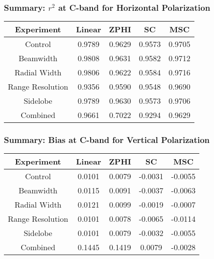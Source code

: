 \begin{frame}
    \frametitle{Summary: $r^2$ at C-band for Horizontal Polarization}
    \begin{center}
        \begin{tabular}{| c | c | c | c | c |}
            \hline
            Experiment & Linear & ZPHI & SC & MSC \\
            \hline
            \hline
            Control & 0.9789 & 0.9629 & 0.9573 & 0.9705 \\
            Beamwidth & 0.9808 & 0.9631 & 0.9582 & 0.9712 \\
            Radial Width & 0.9806 & 0.9622 & 0.9584 & 0.9716 \\
            Range Resolution & 0.9356 & 0.9590 & 0.9548 & 0.9690 \\
            Sidelobe & 0.9789 & 0.9630 & 0.9573 & 0.9706 \\
            Combined & 0.9661 & 0.7022 & 0.9294 & 0.9629 \\
            \hline
        \end{tabular}
    \end{center}
\end{frame}

\begin{frame}
    \frametitle{Summary: Bias at C-band for Vertical Polarization}
    \begin{center}
        \begin{tabular}{| c | c | c | c | c |}
            \hline
            Experiment & Linear & ZPHI & SC & MSC \\
            \hline
            \hline
            Control & 0.0101 & 0.0079 & -0.0031 & -0.0055 \\
            Beamwidth & 0.0115 & 0.0091 & -0.0037 & -0.0063 \\
            Radial Width & 0.0121 & 0.0099 & -0.0019 & -0.0007 \\
            Range Resolution & 0.0101 & 0.0078 & -0.0065 & -0.0114 \\
            Sidelobe & 0.0101 & 0.0079 & -0.0032 & -0.0055 \\
            Combined & 0.1445 & 0.1419 & 0.0079 & -0.0028 \\
            \hline
        \end{tabular}
    \end{center}
\end{frame}

